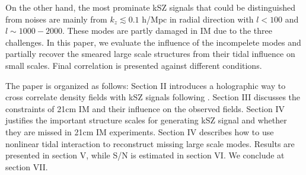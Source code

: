 On the other hand, the most prominate kSZ signals that could be distinguished from noises  
are mainly from $k_z\lesssim0.1$ h/Mpc in radial direction 
with $l < 100$ and $l \sim 1000-2000$. 
These modes are partly damaged in IM due to the three challenges. 
In this paper, we evaluate the 
influence of the incompelete modes
and partially recover the smeared large scale structures 
from their tidal influence on small scales\cite{2012:pen,2015:zhu}. 
Final correlation is presented against different conditions.

The paper is organized as follows: 
Section II introduces a holographic way to 
cross correlate density fields with kSZ signals following \cite{Shao11}. 
Section III discusses the constraints of 21cm IM and their influence on 
the observed fields. 
Section IV justifies the important structure scales for generating 
kSZ signal and whether they are missed in 21cm IM experiments. 
Section IV describes how to use nonlinear tidal interaction 
to reconstruct missing large scale modes. 
Results are presented in section V, 
while S/N is estimated in section VI.
We conclude at section VII.

